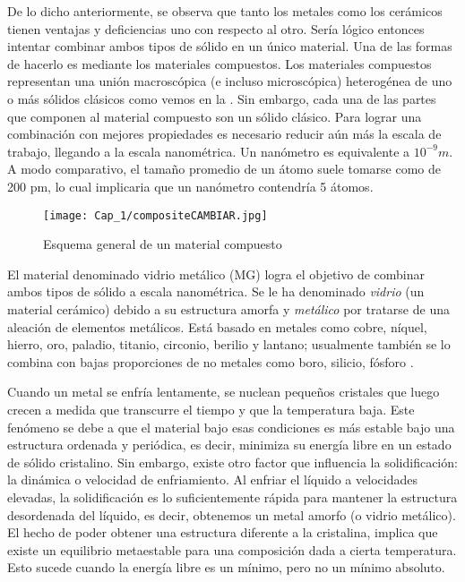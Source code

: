 De lo dicho anteriormente, se observa que tanto los metales como los cerámicos tienen ventajas y deficiencias uno con respecto al otro. Sería lógico entonces intentar combinar ambos tipos de sólido en un único material. Una de las formas de hacerlo es mediante los materiales compuestos. Los materiales compuestos representan una unión macroscópica (e incluso microscópica) heterogénea de uno o más sólidos clásicos como vemos en la . Sin embargo, cada una de las partes que componen al material compuesto son un sólido clásico. Para lograr una combinación con mejores propiedades es necesario reducir aún más la escala de trabajo, llegando a la escala nanométrica. Un nanómetro es equivalente a $10^{-9} m$. A modo comparativo, el tamaño promedio de un átomo suele tomarse como de 200 pm, lo cual implicaria que un nanómetro contendría 5 átomos.

\begin{figure}[h!]
 \centering
 \texttt{[image: Cap\_1/compositeCAMBIAR.jpg]}
 \caption[Material compuesto]{Esquema general de un material compuesto}
 \label{C1:fg:composite}
\end{figure}

El material denominado vidrio metálico (MG) logra el objetivo de combinar ambos tipos de sólido a escala nanométrica. Se le ha denominado \textit{vidrio} (un material cerámico) debido a su estructura amorfa y \textit{metálico} por tratarse de una aleación de elementos metálicos. Está basado en metales como cobre, níquel, hierro, oro, paladio, titanio, circonio, berilio y lantano; usualmente también se lo combina con bajas proporciones de no metales como boro, silicio, fósforo \citep{andrievski13}.

Cuando un metal se enfría lentamente, se nuclean pequeños cristales que luego crecen a medida que transcurre el tiempo y que la temperatura baja. Este fenómeno se debe a que el material bajo esas condiciones es más estable bajo una estructura ordenada y periódica, es decir, minimiza su energía libre en un estado de sólido cristalino. Sin embargo, existe otro factor que influencia la solidificación: la dinámica o velocidad de enfriamiento. Al enfriar el líquido a velocidades elevadas, la solidificación es lo suficientemente rápida para mantener la estructura desordenada del líquido, es decir, obtenemos un metal amorfo (o vidrio metálico). El hecho de poder obtener una estructura diferente a la cristalina, implica que existe un equilibrio metaestable para una composición dada a cierta temperatura. Esto sucede cuando la energía libre es un mínimo, pero no un mínimo absoluto.

